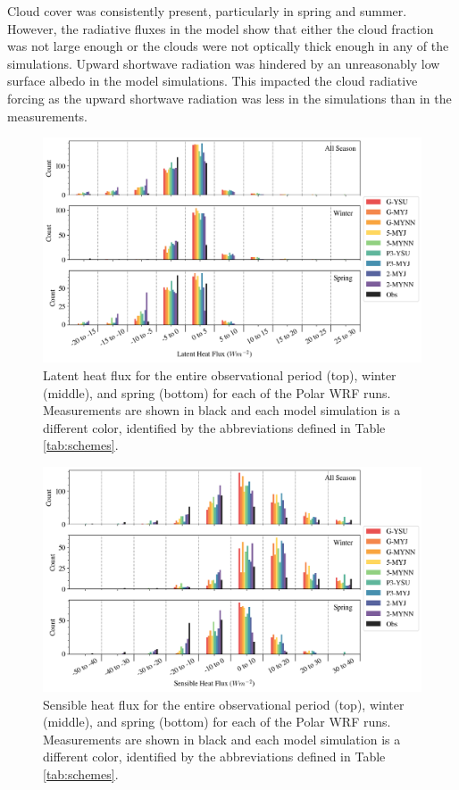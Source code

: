 Cloud cover was consistently present, particularly in spring and summer. However, the radiative fluxes in the model show that either the cloud fraction was not large enough or the clouds were not optically thick enough in any of the simulations. Upward shortwave radiation was hindered by an unreasonably low surface albedo in the model simulations. This impacted the cloud radiative forcing as the upward shortwave radiation was less in the simulations than in the measurements. 


\begin{figure}[h]
    \centering
    \includegraphics[width=1\linewidth]{figures/chapter3/WRF_LHF_Histo.png}
    \caption[Polar WRF simulated latent heat flux histograms.]{Latent heat flux for the entire observational period (top), winter (middle), and spring (bottom) for each of the Polar WRF runs. Measurements are shown in black and each model simulation is a different color, identified by the abbreviations defined in Table \ref{tab:schemes}.}
    \label{fig:wrf_hlf}
\end{figure}

\begin{figure}[h]
    \centering
    \includegraphics[width=1\linewidth]{figures/chapter3/WRF_SHF_Histo.png}
    \caption[Polar WRF simulated sensible heat flux histograms.]{Sensible heat flux for the entire observational period (top), winter (middle), and spring (bottom) for each of the Polar WRF runs. Measurements are shown in black and each model simulation is a different color, identified by the abbreviations defined in Table \ref{tab:schemes}.}
    \label{fig:wrf_shf}
\end{figure}

